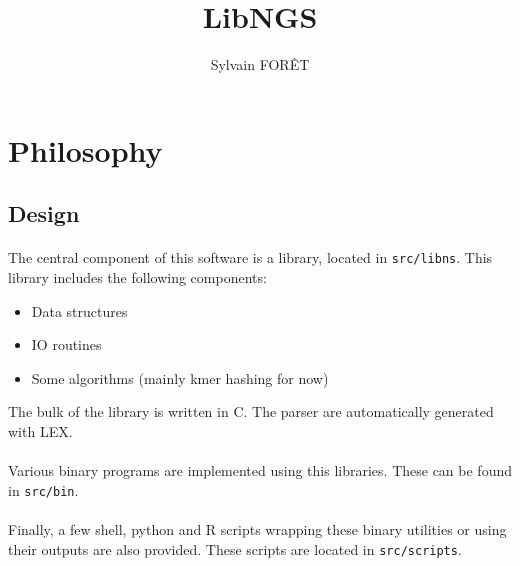 \documentclass[a4paper,12pt]{article}
\title{LibNGS}
\author{Sylvain FOR\^ET}
\begin{document}
\maketitle

\newpage

\tableofcontents

\newpage


\section{Philosophy}


\subsection{Design}

\paragraph{}
The central component of this software is a library, located in
\texttt{src/libns}.
This library includes the following components:
\begin{itemize}
    \item Data structures
    \item IO routines
    \item Some algorithms (mainly kmer hashing for now)
\end{itemize}
The bulk of the library is written in C.
The parser are automatically generated with LEX.

\paragraph{}
Various binary programs are implemented using this libraries.
These can be found in \texttt{src/bin}.

\paragraph{}
Finally, a few shell, python and R scripts wrapping these binary utilities or
using their outputs are also provided.
These scripts are located in \texttt{src/scripts}.
\end{document}
